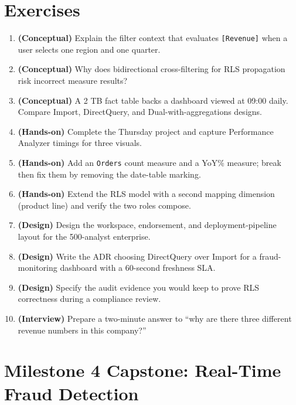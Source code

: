 \section{Exercises}
\begin{enumerate}
    \item \textbf{(Conceptual)} Explain the filter context that evaluates \texttt{[Revenue]} when a user selects one region and one quarter.
    \item \textbf{(Conceptual)} Why does bidirectional cross-filtering for RLS propagation risk incorrect measure results?
    \item \textbf{(Conceptual)} A 2 TB fact table backs a dashboard viewed at 09:00 daily. Compare Import, DirectQuery, and Dual-with-aggregations designs.
    \item \textbf{(Hands-on)} Complete the Thursday project and capture Performance Analyzer timings for three visuals.
    \item \textbf{(Hands-on)} Add an \texttt{Orders} count measure and a YoY\% measure; break then fix them by removing the date-table marking.
    \item \textbf{(Hands-on)} Extend the RLS model with a second mapping dimension (product line) and verify the two roles compose.
    \item \textbf{(Design)} Design the workspace, endorsement, and deployment-pipeline layout for the 500-analyst enterprise.
    \item \textbf{(Design)} Write the ADR choosing DirectQuery over Import for a fraud-monitoring dashboard with a 60-second freshness SLA.
    \item \textbf{(Design)} Specify the audit evidence you would keep to prove RLS correctness during a compliance review.
    \item \textbf{(Interview)} Prepare a two-minute answer to ``why are there three different revenue numbers in this company?''
\end{enumerate}

\section{Milestone 4 Capstone: Real-Time Fraud Detection}\label{sec:ch16-capstone}

